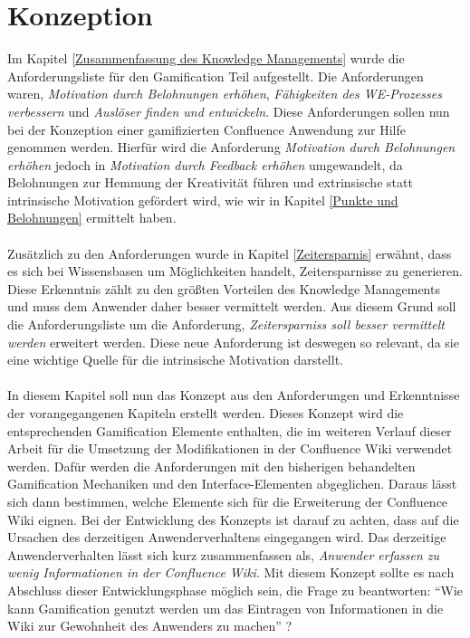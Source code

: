\documentclass[a4paper,12pt]{scrartcl}
\begin{document}
\section{Konzeption}
\label{Konzeption}
Im Kapitel \ref{Zusammenfassung des Knowledge Managements} wurde die Anforderungsliste für den Gamification Teil aufgestellt. Die Anforderungen waren, \textit{Motivation durch Belohnungen erhöhen}, \textit{Fähigkeiten des WE-Prozesses verbessern} und \textit{Auslöser finden und entwickeln}. Diese Anforderungen sollen nun bei der Konzeption einer gamifizierten Confluence Anwendung zur Hilfe genommen werden. Hierfür wird die Anforderung \textit{Motivation durch Belohnungen erhöhen} jedoch in \textit{Motivation durch Feedback erhöhen} umgewandelt, da Belohnungen zur Hemmung der Kreativität führen und extrinsische statt intrinsische Motivation gefördert wird, wie wir in Kapitel \ref{Punkte und Belohnungen} ermittelt haben. 
\\\\
Zusätzlich zu den Anforderungen wurde in Kapitel \ref{Zeitersparnis} erwähnt, dass es sich bei Wissensbasen um Möglichkeiten handelt, Zeitersparnisse zu generieren. Diese Erkenntnis zählt zu den größten Vorteilen des Knowledge Managements und muss dem Anwender daher besser vermittelt werden. Aus diesem Grund soll die Anforderungsliste um die Anforderung, \textit{Zeitersparniss soll besser vermittelt werden} erweitert werden. Diese neue Anforderung ist deswegen so relevant, da sie eine wichtige Quelle für die intrinsische Motivation darstellt.
\\\\
In diesem Kapitel soll nun das Konzept aus den Anforderungen und Erkenntnisse der vorangegangenen Kapiteln erstellt werden. Dieses Konzept wird die entsprechenden Gamification Elemente enthalten, die im weiteren Verlauf dieser Arbeit für die Umsetzung der Modifikationen in der Confluence Wiki verwendet werden. Dafür werden die Anforderungen mit den bisherigen behandelten Gamification Mechaniken und den Interface-Elementen abgeglichen. Daraus lässt sich dann bestimmen, welche Elemente sich für die Erweiterung der Confluence Wiki eignen. Bei der Entwicklung des Konzepts ist darauf zu achten, dass auf die Ursachen des derzeitigen Anwenderverhaltens eingegangen wird. Das derzeitige Anwenderverhalten lässt sich kurz zusammenfassen als, \textit{Anwender erfassen zu wenig Informationen in der Confluence Wiki}. Mit diesem Konzept sollte es nach Abschluss dieser Entwicklungsphase möglich sein, die Frage zu beantworten: \enquote{Wie kann Gamification genutzt werden um das Eintragen von Informationen in die Wiki zur Gewohnheit des Anwenders zu machen} ?
\end{document}
